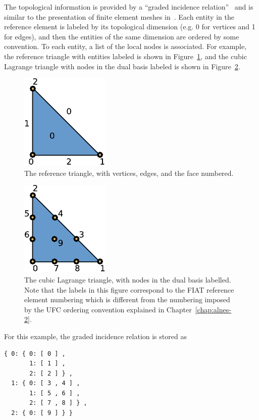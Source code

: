 The topological information is provided by a ``graded incidence
relation''~\citep{Kirby2006a,KnepleyKarpeev2009} and is similar to the
presentation of finite element meshes in~\citet{Logg2009}.  Each entity in
the reference element is labeled by its topological dimension (e.g. 0 for
vertices and 1 for edges), and then the entities of the same dimension
are ordered by some convention.  To each entity, a list of the local nodes
is associated.  For example, the reference triangle with entities labeled
is shown in Figure~\ref{fig:reftri}, and the cubic Lagrange triangle
with nodes in the dual basis labeled is shown in Figure~\ref{fig:p3}.

\begin{figure}
  \centering
  \includegraphics[width=\largefig]{chapters/kirby-2/pdf/reftri.pdf}
  \caption{The reference triangle, with vertices, edges, and the
    face numbered.}
  \label{fig:reftri}
\end{figure}

\begin{figure}
  \centering
  \includegraphics[width=\largefig]{chapters/kirby-2/pdf/P3.pdf}
  \caption{The cubic Lagrange triangle, with nodes in the dual basis
    labelled. Note that the labels in this figure correspond to the
    FIAT reference element numbering which is different from the
    numbering imposed by the UFC ordering convention explained in
    Chapter~\ref{chap:alnes-2}.}
  \label{fig:p3}
\end{figure}

For this example, the graded incidence relation is stored as
\begin{verbatim}
{ 0: { 0: [ 0 ] ,
       1: [ 1 ] ,
       2: [ 2 ] } ,
  1: { 0: [ 3 , 4 ] ,
       1: [ 5 , 6 ] ,
       2: [ 7 , 8 ] } ,
  2: { 0: [ 9 ] } }
\end{verbatim}

